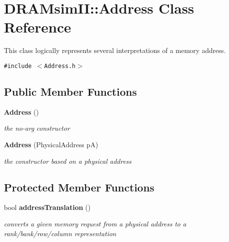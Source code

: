 \section{DRAMsimII::Address Class Reference}
\label{class_d_r_a_msim_i_i_1_1_address}
This class logically represents several interpretations of a memory address.  


{\tt \#include $<$Address.h$>$}

\subsection*{Public Member Functions}
\begin{CompactItemize}
\item 
{\bf Address} ()\label{class_d_r_a_msim_i_i_1_1_address_63f910c09d93bdd16d3744e47d13dc0e}

\begin{CompactList}\small\item\em the no-arg constructor \item\end{CompactList}\item 
{\bf Address} (PhysicalAddress pA)\label{class_d_r_a_msim_i_i_1_1_address_8204347dbc9ff580abd2446bb7edd255}

\begin{CompactList}\small\item\em the constructor based on a physical address \item\end{CompactList}\end{CompactItemize}
\subsection*{Protected Member Functions}
\begin{CompactItemize}
\item 
bool {\bf addressTranslation} ()
\begin{CompactList}\small\item\em converts a given memory request from a physical address to a rank/bank/row/column representation \item\end{CompactList}\end{CompactItemize}
